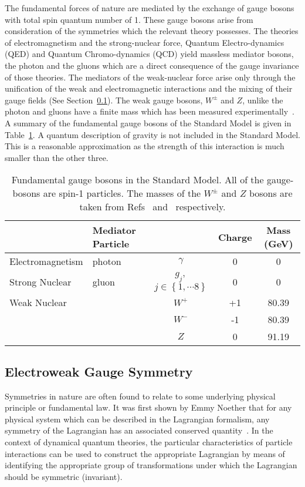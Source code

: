 The fundamental forces of nature are mediated by the exchange of gauge bosons
with total spin quantum number of 1.   
These gauge bosons arise from consideration of the symmetries which 
the relevant theory possesses. The theories of electromagnetism 
and the strong-nuclear force, Quantum Electro-dynamics (QED) and 
Quantum Chromo-dynamics (QCD) yield massless mediator bosons, the photon
and the gluons which are a direct consequence of the gauge invariance of those
theories. The mediators of the weak-nuclear force arise only through 
the unification of the weak and electromagnetic interactions and the mixing
of their gauge fields (See Section~\ref{sec:ewksymmetry}). 
The weak gauge bosons, $W^{\pm}$ and $Z$, unlike the photon and gluons 
have a finite mass which has been measured experimentally~\citep{combinedWmass,pdg}.
A summary of the fundamental gauge bosons of the Standard Model is given in 
Table~\ref{tab:bosons}. A quantum description of gravity is not included in the Standard Model.
This is a reasonable approximation as the strength of this interaction 
is much smaller than the other three.
\begin{table}[htbp!]
\begin{tabular}{|l|l c|c|c|}
\hline 
	& \textbf{Mediator Particle} & & \textbf{Charge} & \textbf{Mass (GeV)} \\
\hline
Electromagnetism & photon & $\gamma$ 			& 0 & 0   \\
\hline
Strong Nuclear   & gluon  & $g_{j},$ $j\in\left\{1,\cdots8\right\}$ 	& 0 & 0   \\
\hline
Weak Nuclear 	 &  &  $W^{+}$ & +1 & 80.39 \\
	 	 &  &  $W^{-}$ & -1 & 80.39 \\
	 	 &  &  $Z$     & 0  & 91.19 \\
\hline
\end{tabular}
\caption{Fundamental gauge bosons in the Standard Model.
All of the gauge-bosons are spin-1 particles.
The masses of the $W^{\pm}$ and $Z$ bosons are taken from 
Refs~\citep{combinedWmass} and~\citep{pdg} respectively.}
\label{tab:bosons}
\end{table}

\subsection{Electroweak Gauge Symmetry}
\label{sec:ewksymmetry}

Symmetries in nature are often found to relate to some underlying physical principle 
or fundamental law. It was first shown by Emmy Noether 
that for any physical system which can be described in the Lagrangian formalism,
any symmetry of the Lagrangian has an associated conserved quantity~\cite{null}.
In the context of dynamical quantum theories, the particular characteristics of 
particle interactions can be used to construct the appropriate Lagrangian 
by means of identifying the appropriate group of transformations under which 
the Lagrangian should be symmetric (invariant). 

